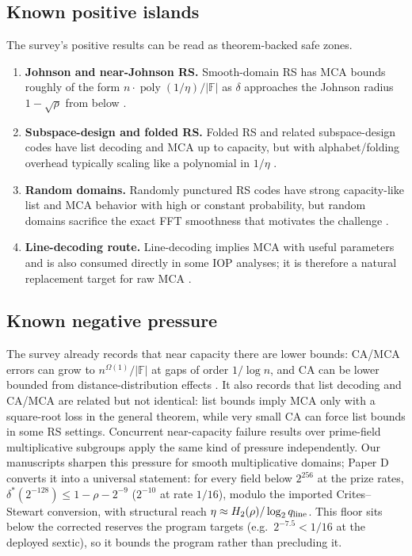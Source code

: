 \documentclass[11pt]{article}
\theoremstyle{definition}
\theoremstyle{remark}
\newcommand{\F}{\mathbb F}
\newcommand{\poly}{\operatorname{poly}}
\newcommand{\qline}{q_{\rm line}}
\newcommand{\paperD}{Paper D}
\begin{document}
\subsection{Known positive islands}

The survey's positive results can be read as theorem-backed safe zones.
\begin{enumerate}[leftmargin=2.2em]
\item \textbf{Johnson and near-Johnson RS.}  Smooth-domain RS has MCA bounds roughly of the form $n\cdot\poly(1/\eta)/|\F|$ as $\delta$ approaches the Johnson radius $1-\sqrt{\rho}$ from below \cite{BCIKS20,BCHKS25}.
\item \textbf{Subspace-design and folded RS.}  Folded RS and related subspace-design codes have list decoding and MCA up to capacity, but with alphabet/folding overhead typically scaling like a polynomial in $1/\eta$ \cite{CZ25,GG25}.
\item \textbf{Random domains.}  Randomly punctured RS codes have strong capacity-like list and MCA behavior with high or constant probability, but random domains sacrifice the exact FFT smoothness that motivates the challenge \cite{AGL24}.
\item \textbf{Line-decoding route.}  Line-decoding implies MCA with useful parameters and is also consumed directly in some IOP analyses; it is therefore a natural replacement target for raw MCA \cite{GCXK25,GG25}.
\end{enumerate}

\subsection{Known negative pressure}

The survey already records that near capacity there are lower bounds: CA/MCA errors can grow to $n^{\Omega(1)}/|\F|$ at gaps of order $1/\log n$, and CA can be lower bounded from distance-distribution effects \cite{CS25,DG25}.  It also records that list decoding and CA/MCA are related but not identical: list bounds imply MCA only with a square-root loss in the general theorem, while very small CA can force list bounds in some RS settings.  Concurrent near-capacity failure results over prime-field multiplicative subgroups \cite{KKH26,Kambire26} apply the same kind of pressure independently.  Our manuscripts sharpen this pressure for smooth multiplicative domains; \paperD{} converts it into a universal statement: for every field below $2^{256}$ at the prize rates, $\delta^*(2^{-128})\le1-\rho-2^{-9}$ ($2^{-10}$ at rate $1/16$), modulo the imported Crites--Stewart conversion, with structural reach $\eta\approx H_2(\rho)/\log_2\qline$.  This floor sits below the corrected reserves the program targets (e.g.\ $2^{-7.5}<1/16$ at the deployed sextic), so it bounds the program rather than precluding it.
\end{document}
